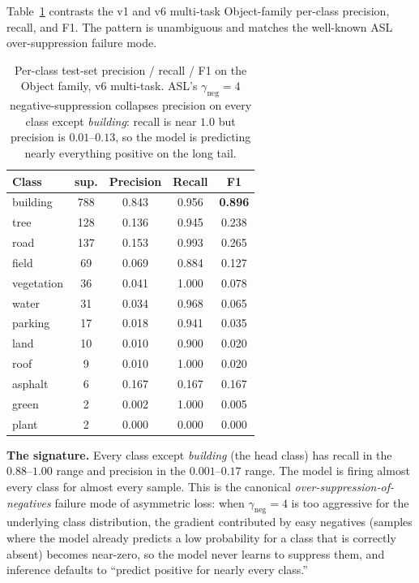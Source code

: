 \documentclass[journal]{IEEEtran}
\begin{document}
Table~\ref{tab:object-classes} contrasts the v1 and v6 multi-task Object-family per-class precision, recall, and F1. The pattern is unambiguous and matches the well-known ASL over-suppression failure mode.

\begin{table}[!t]
  \caption{Per-class test-set precision / recall / F1 on the Object family, v6 multi-task. ASL's $\gamma_\mathrm{neg}{=}4$ negative-suppression collapses precision on every class except \emph{building}: recall is near $1.0$ but precision is $0.01$--$0.13$, so the model is predicting nearly everything positive on the long tail.}
  \label{tab:object-classes}
  \centering
  \small
  \begin{tabular}{@{}lcccc@{}}
  \toprule
  Class      & sup. & Precision & Recall & F1 \\
  \midrule
  building   & 788 & 0.843 & 0.956 & \textbf{0.896} \\
  tree       & 128 & 0.136 & 0.945 & 0.238 \\
  road       & 137 & 0.153 & 0.993 & 0.265 \\
  field      &  69 & 0.069 & 0.884 & 0.127 \\
  vegetation &  36 & 0.041 & 1.000 & 0.078 \\
  water      &  31 & 0.034 & 0.968 & 0.065 \\
  parking    &  17 & 0.018 & 0.941 & 0.035 \\
  land       &  10 & 0.010 & 0.900 & 0.020 \\
  roof       &   9 & 0.010 & 1.000 & 0.020 \\
  asphalt    &   6 & 0.167 & 0.167 & 0.167 \\
  green      &   2 & 0.002 & 1.000 & 0.005 \\
  plant      &   2 & 0.000 & 0.000 & 0.000 \\
  \bottomrule
  \end{tabular}
\end{table}

\textbf{The signature.} Every class except \emph{building} (the head class) has recall in the $0.88$--$1.00$ range and precision in the $0.001$--$0.17$ range. The model is firing almost every class for almost every sample. This is the canonical \emph{over-suppression-of-negatives} failure mode of asymmetric loss: when $\gamma_\mathrm{neg}{=}4$ is too aggressive for the underlying class distribution, the gradient contributed by easy negatives (samples where the model already predicts a low probability for a class that is correctly absent) becomes near-zero, so the model never learns to suppress them, and inference defaults to ``predict positive for nearly every class.''
\end{document}
